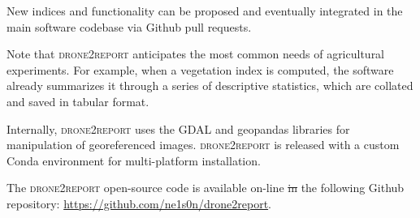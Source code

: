 \documentclass[drones,technicalnote,accept,pdftex,moreauthors]{Definitions/mdpi}
\providecommand{\DIFadd}[1]{{\protect\color{blue}\uwave{#1}}} %
\providecommand{\DIFdel}[1]{{\protect\color{red}\sout{#1}}}                      %
\providecommand{\DIFaddbegin}{} %
\providecommand{\DIFaddend}{} %
\providecommand{\DIFdelbegin}{} %
\providecommand{\DIFdelend}{} %
\newcommand{\DIFscaledelfig}{0.5}
\newlength{\DIFdelgraphicswidth} %
\newlength{\DIFdelgraphicsheight} %
\newcommand{\DIFaddincludegraphics}[2][]{{\color{blue}\fbox{\DIFOincludegraphics[#1]{#2}}}} %
\newcommand{\DIFdelincludegraphics}[2][]{%
\sbox{\DIFdelgraphicsbox}{\DIFOincludegraphics[#1]{#2}}%
\settoboxwidth{\DIFdelgraphicswidth}{\DIFdelgraphicsbox} %
\settoboxtotalheight{\DIFdelgraphicsheight}{\DIFdelgraphicsbox} %
\scalebox{\DIFscaledelfig}{%
\parbox[b]{\DIFdelgraphicswidth}{\usebox{\DIFdelgraphicsbox}\\[-\baselineskip] \rule{\DIFdelgraphicswidth}{0em}}\llap{\resizebox{\DIFdelgraphicswidth}{\DIFdelgraphicsheight}{%
\setlength{\unitlength}{\DIFdelgraphicswidth}%
\begin{picture}(1,1)%
\thicklines\linethickness{2pt} %
{\color[rgb]{1,0,0}\put(0,0){\framebox(1,1){}}}%
{\color[rgb]{1,0,0}\put(0,0){\line( 1,1){1}}}%
{\color[rgb]{1,0,0}\put(0,1){\line(1,-1){1}}}%
\end{picture}%
}\hspace*{3pt}}} %
} %
\DeclareRobustCommand{\DIFaddbegin}{\DIFOaddbegin \let\includegraphics\DIFaddincludegraphics} %
\DeclareRobustCommand{\DIFaddend}{\DIFOaddend \let\includegraphics\DIFOincludegraphics} %
\DeclareRobustCommand{\DIFdelbegin}{\DIFOdelbegin \let\includegraphics\DIFdelincludegraphics} %
\DeclareRobustCommand{\DIFdelend}{\DIFOaddend \let\includegraphics\DIFOincludegraphics} %
\begin{document}
New indices and functionality can be proposed and eventually integrated in the main software codebase via Github pull requests.

Note that \textsc{drone2report} anticipates the most common needs of agricultural experiments. For example, when a vegetation index is computed, the software already summarizes it through a series of descriptive statistics, which are collated and saved in tabular format.

Internally, \textsc{drone2report} uses the GDAL \cite{GDALmanual} and geopandas \cite{kelsey_jordahl_2020_3946761} libraries for manipulation of georeferenced images. \textsc{drone2report} is released with a custom Conda environment for multi-platform installation.

The \textsc{drone2report} open-source code is available on-line \DIFdelbegin \DIFdel{in }\DIFdelend \DIFaddbegin \DIFadd{at }\DIFaddend the following Github repository: \url{https://github.com/ne1s0n/drone2report}.
\end{document}
